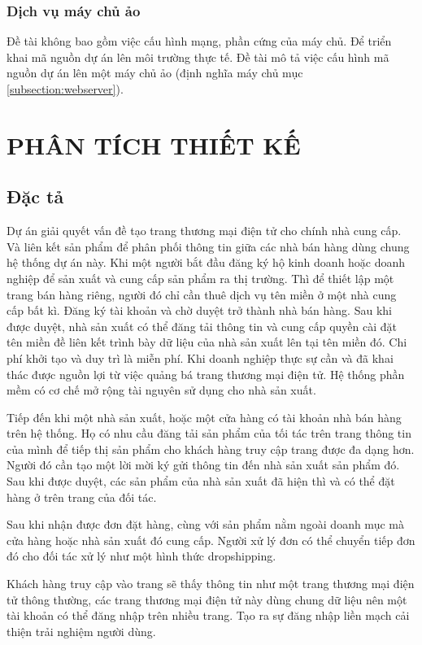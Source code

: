 \documentclass[11pt]{report}
\begin{document}
	\subsection{Dịch vụ máy chủ ảo}
	Đề tài không bao gồm việc cấu hình mạng, phần cứng của máy chủ. Để triển khai mã nguồn dự án lên môi trường thực tế. Đề tài mô tả việc cấu hình mã nguồn dự án lên một máy chủ ảo (định nghĩa máy chủ mục \ref{subsection:webserver}).
	
	\chapter{PHÂN TÍCH THIẾT KẾ}
	\fontsize{13px}{13px}\selectfont\justifying
	\section{Đặc tả}
	
	Dự án giải quyết vấn đề tạo trang thương mại điện tử cho chính nhà cung cấp. Và liên kết sản phẩm để phân phối thông tin giữa các nhà bán hàng dùng chung hệ thống dự án này. Khi một người bắt đầu đăng ký hộ kinh doanh hoặc doanh nghiệp để sản xuất và cung cấp sản phẩm ra thị trường. Thì để thiết lập một trang bán hàng riêng, người đó chỉ cần thuê dịch vụ tên miền ở một nhà cung cấp bất kì. Đăng ký tài khoản và chờ duyệt trở thành nhà bán hàng. Sau khi được duyệt, nhà sản xuất có thể đăng tải thông tin và cung cấp quyền cài đặt tên miền đề liên kết trình bày dữ liệu của nhà sản xuất lên tại tên miền đó. Chi phí khởi tạo và duy trì là miễn phí. Khi doanh nghiệp thực sự cần và đã khai thác được nguồn lợi từ việc quảng bá trang thương mại điện tử. Hệ thống phần mềm có cơ chế mở rộng tài nguyên sử dụng cho nhà sản xuất.
	
	Tiếp đến khi một nhà sản xuất, hoặc một cửa hàng có tài khoản nhà bán hàng trên hệ thống. Họ có nhu cầu đăng tải sản phẩm của tối tác trên trang thông tin của mình để tiếp thị sản phẩm cho khách hàng truy cập trang được đa dạng hơn. Người đó cần tạo một lời mời ký gửi thông tin đến nhà sản xuất sản phẩm đó. Sau khi được duyệt, các sản phẩm của nhà sản xuất đã hiện thì và có thể đặt hàng ở trên trang của đối tác.
	
	Sau khi nhận được đơn đặt hàng, cùng với sản phẩm nằm ngoài doanh mục mà cửa hàng hoặc nhà sản xuất đó cung cấp. Người xử lý đơn có thể chuyển tiếp đơn đó cho đối tác xử lý như một hình thức dropshipping.
	
	Khách hàng truy cập vào trang sẽ thấy thông tin như một trang thương mại điện tử thông thường, các trang thương mại điện tử này dùng chung dữ liệu nên một tài khoản có thể đăng nhập trên nhiều trang. Tạo ra sự đăng nhập liền mạch cải thiện trải nghiệm người dùng.
	
\end{document}
